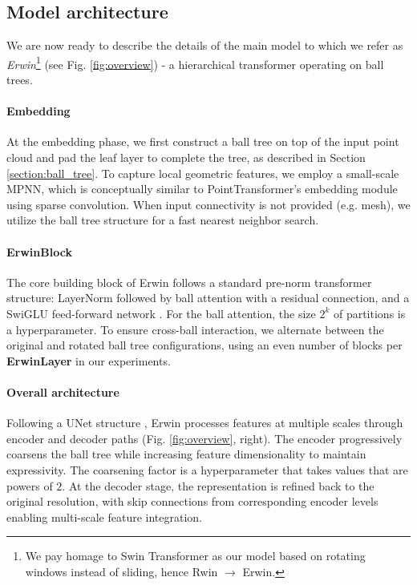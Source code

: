 \subsection{Model architecture}
\vspace{-2pt}
We are now ready to describe the details of the main model to which we refer as \emph{Erwin}\footnote{We pay homage to Swin Transformer as our model based on rotating windows instead of sliding, hence Rwin $\rightarrow$ Erwin.} (see Fig. \ref{fig:overview}) - a hierarchical transformer operating on ball trees.

\vspace{-8pt}
\paragraph{Embedding}
At the embedding phase, we first construct a ball tree on top of the input point cloud and pad the leaf layer to complete the tree, as described in Section \ref{section:ball_tree}. To capture local geometric features, we employ a small-scale MPNN, which is conceptually similar to PointTransformer's embedding module using sparse convolution. When input connectivity is not provided (e.g. mesh), we utilize the ball tree structure for a fast nearest neighbor search.

\vspace{-8pt}
\paragraph{ErwinBlock}
The core building block of Erwin follows a standard pre-norm transformer structure: LayerNorm followed by ball attention with a residual connection, and a SwiGLU feed-forward network \cite{Shazeer2020GLUVI}. For the ball attention, the size $2^k$ of partitions is a hyperparameter. To ensure cross-ball interaction, we alternate between the original and rotated ball tree configurations, using an even number of blocks per \textbf{ErwinLayer} in our experiments.

\vspace{-8pt}
\paragraph{Overall architecture}
Following a UNet structure \cite{Ronneberger2015UNetCN, Wu2023PointTV}, Erwin processes features at multiple scales through encoder and decoder paths (Fig. \ref{fig:overview}, right). The encoder progressively coarsens the ball tree while increasing feature dimensionality to maintain expressivity. The coarsening factor is a hyperparameter that takes values that are powers of $2$. At the decoder stage, the representation is refined back to the original resolution, with skip connections from corresponding encoder levels enabling multi-scale feature integration.



